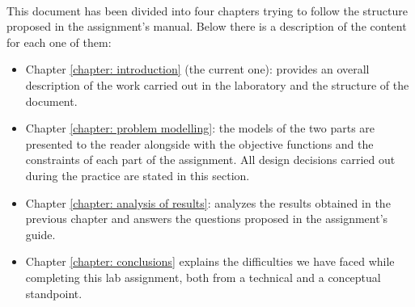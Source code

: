 \paragraph{}
This document has been divided into four chapters trying to follow the structure proposed in the assignment's manual. Below there is a description of the content for each one of them:
\begin{itemize}
    \item Chapter \ref{chapter: introduction} (the current one): provides an overall description of the work carried out in the laboratory and the structure of the document.
    
    \item Chapter \ref{chapter: problem modelling}: the models of the two parts are presented to the reader alongside with the objective functions and the constraints of each part of the assignment. All design decisions carried out during the practice are stated in this section.
    
    \item Chapter \ref{chapter: analysis of results}: analyzes the results obtained in the previous chapter and answers the questions proposed in the assignment's guide. 
    
    \item Chapter \ref{chapter: conclusions} explains the difficulties we have faced while completing this lab assignment, both from a technical and a conceptual standpoint.
\end{itemize}